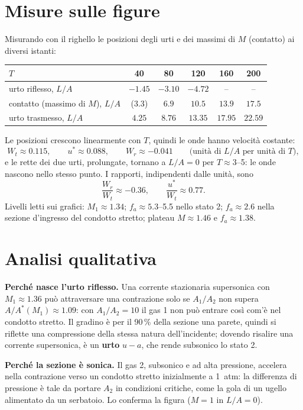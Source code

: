 \documentclass[11pt,a4paper]{article}
\newcommand{\uma}{u-a}
\newcommand{\fa}{f_a}
\begin{document}
\section{Misure sulle figure}\label{sec:misure}
Misurando con il righello le posizioni degli urti e dei massimi di $M$ (contatto) ai diversi istanti:
\begin{table}[H]
  \centering
  \begin{tabular}{lccccc}
    \toprule
    $T$ & 40 & 80 & 120 & 160 & 200 \\
    \midrule
    urto riflesso, $L/A$ & $-1.45$ & $-3.10$ & $-4.72$ & -- & -- \\
    contatto (massimo di $M$), $L/A$ & ($3.3$) & $6.9$ & $10.5$ & $13.9$ & $17.5$ \\
    urto trasmesso, $L/A$ & $4.25$ & $8.76$ & $13.35$ & $17.95$ & $22.59$ \\
    \bottomrule
  \end{tabular}
\end{table}
Le posizioni crescono linearmente con $T$, quindi le onde hanno velocità costante:
\[
  W_t\approx\num{0.115},\qquad u^*\approx\num{0.088},\qquad W_r\approx-\num{0.041}\qquad
  \text{(unità di $L/A$ per unità di $T$)},
\]
e le rette dei due urti, prolungate, tornano a $L/A=0$ per $T\approx3$--\num{5}: le onde nascono nello stesso punto.
I rapporti, indipendenti dalle unità, sono
\[
  \frac{W_r}{W_t}\approx-\num{0.36},\qquad \frac{u^*}{W_t}\approx\num{0.77}.
\]
Livelli letti sui grafici: $M_1\approx\num{1.34}$; $\fa\approx\num{5.3}$--\num{5.5} nello stato 2; $\fa\approx\num{2.6}$ nella
sezione d'ingresso del condotto stretto; plateau $M\approx\num{1.46}$ e $\fa\approx\num{1.38}$.

\section{Analisi qualitativa}
\textbf{Perché nasce l'urto riflesso.} Una corrente stazionaria supersonica con $M_1\approx\num{1.36}$ può
attraversare una contrazione solo se $A_1/A_2$ non supera $A/A^*(M_1)\approx\num{1.09}$: con $A_1/A_2=10$ il
gas 1 non può entrare così com'è nel condotto stretto. Il gradino è per il 90\,\% della sezione una parete,
quindi si riflette una compressione della stessa natura dell'incidente; dovendo risalire una corrente
supersonica, è un \textbf{urto} $\uma$, che rende subsonico lo stato 2.

\textbf{Perché la sezione è sonica.} Il gas 2, subsonico e ad alta pressione, accelera nella contrazione verso
un condotto stretto inizialmente a \SI{1}{atm}: la differenza di pressione è tale da portare $A_2$ in condizioni
critiche, come la gola di un ugello alimentato da un serbatoio. Lo conferma la figura ($M=1$ in $L/A=0$).
\end{document}
